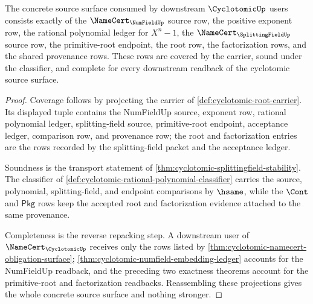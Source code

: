 \begin{theorem}
\label{thm:cyclotomic-splittingfield-source-exactness}
The concrete source surface consumed by downstream $\CyclotomicUp$ users consists exactly of the $\NameCert_{\NumFieldUp}$ source row, the positive exponent row, the rational polynomial ledger for $X^n-1$, the $\NameCert_{\SplittingFieldUp}$ source row, the primitive-root endpoint, the root row, the factorization rows, and the shared provenance rows. These rows are covered by the carrier, sound under the classifier, and complete for every downstream readback of the cyclotomic source surface.
\end{theorem}
\begin{proof}
Coverage follows by projecting the carrier of \autoref{def:cyclotomic-root-carrier}. Its displayed tuple contains the NumFieldUp source, exponent row, rational polynomial ledger, splitting-field source, primitive-root endpoint, acceptance ledger, comparison row, and provenance row; the root and factorization entries are the rows recorded by the splitting-field packet and the acceptance ledger.

Soundness is the transport statement of \autoref{thm:cyclotomic-splittingfield-stability}. The classifier of \autoref{def:cyclotomic-rational-polynomial-classifier} carries the source, polynomial, splitting-field, and endpoint comparisons by $\hsame$, while the $\Cont$ and $\mathsf{Pkg}$ rows keep the accepted root and factorization evidence attached to the same provenance.

Completeness is the reverse repacking step. A downstream user of $\NameCert_{\CyclotomicUp}$ receives only the rows listed by \autoref{thm:cyclotomic-namecert-obligation-surface}; \autoref{thm:cyclotomic-numfield-embedding-ledger} accounts for the NumFieldUp readback, and the preceding two exactness theorems account for the primitive-root and factorization readbacks. Reassembling these projections gives the whole concrete source surface and nothing stronger.
\end{proof}

